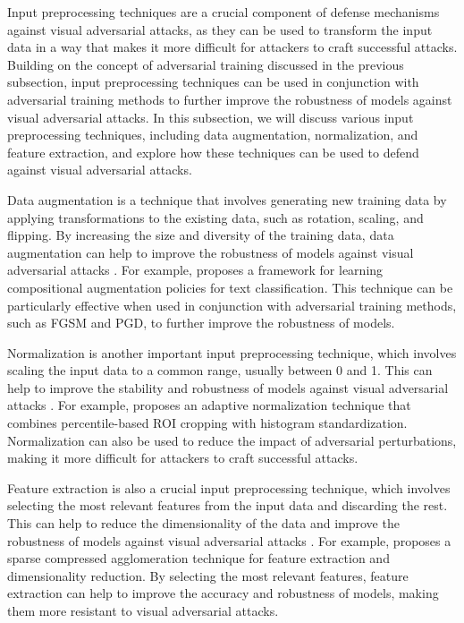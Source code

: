 \documentclass[11pt]{article}
\begin{document}
Input preprocessing techniques are a crucial component of defense mechanisms against visual adversarial attacks, as they can be used to transform the input data in a way that makes it more difficult for attackers to craft successful attacks. Building on the concept of adversarial training discussed in the previous subsection, input preprocessing techniques can be used in conjunction with adversarial training methods to further improve the robustness of models against visual adversarial attacks. In this subsection, we will discuss various input preprocessing techniques, including data augmentation, normalization, and feature extraction, and explore how these techniques can be used to defend against visual adversarial attacks.

Data augmentation is a technique that involves generating new training data by applying transformations to the existing data, such as rotation, scaling, and flipping. By increasing the size and diversity of the training data, data augmentation can help to improve the robustness of models against visual adversarial attacks \cite{ref105}. For example, \cite{ref106} proposes a framework for learning compositional augmentation policies for text classification. This technique can be particularly effective when used in conjunction with adversarial training methods, such as FGSM and PGD, to further improve the robustness of models.

Normalization is another important input preprocessing technique, which involves scaling the input data to a common range, usually between 0 and 1. This can help to improve the stability and robustness of models against visual adversarial attacks \cite{ref104}. For example, \cite{ref107} proposes an adaptive normalization technique that combines percentile-based ROI cropping with histogram standardization. Normalization can also be used to reduce the impact of adversarial perturbations, making it more difficult for attackers to craft successful attacks.

Feature extraction is also a crucial input preprocessing technique, which involves selecting the most relevant features from the input data and discarding the rest. This can help to reduce the dimensionality of the data and improve the robustness of models against visual adversarial attacks \cite{ref108}. For example, \cite{ref109} proposes a sparse compressed agglomeration technique for feature extraction and dimensionality reduction. By selecting the most relevant features, feature extraction can help to improve the accuracy and robustness of models, making them more resistant to visual adversarial attacks.
\end{document}
